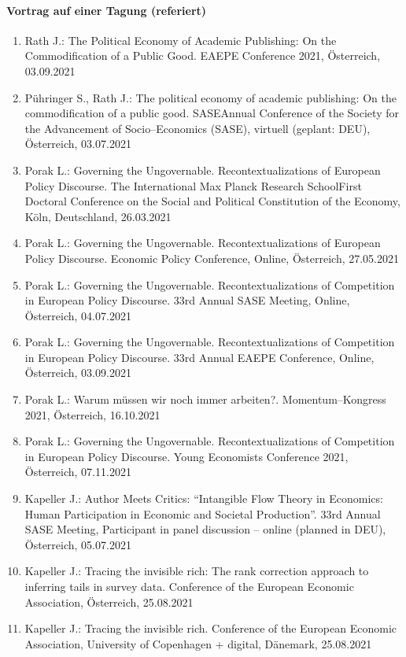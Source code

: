 \paragraph{Vortrag auf einer Tagung (referiert)}
\begin{enumerate}
	\item Rath J.: The Political Economy of Academic Publishing: On the Commodification of a Public Good. EAEPE Conference 2021, Österreich, 03.09.2021
	\item Pühringer S., Rath J.: The political economy of academic publishing: On the commodification of a public good. SASEAnnual Conference of the Society for the Advancement of Socio--Economics (SASE), virtuell (geplant: DEU), Österreich, 03.07.2021
	\item Porak L.: Governing the Ungovernable. Recontextualizations of European Policy Discourse. The International Max Planck Research SchoolFirst Doctoral Conference on the Social and Political Constitution of the Economy, Köln, Deutschland, 26.03.2021
	\item Porak L.: Governing the Ungovernable. Recontextualizations of European Policy Discourse. Economic Policy Conference, Online, Österreich, 27.05.2021
	\item Porak L.: Governing the Ungovernable. Recontextualizations of Competition in European Policy Discourse. 33rd Annual SASE Meeting, Online, Österreich, 04.07.2021
	\item Porak L.: Governing the Ungovernable. Recontextualizations of Competition in European Policy Discourse. 33rd Annual EAEPE Conference, Online, Österreich, 03.09.2021
	\item Porak L.: Warum müssen wir noch immer arbeiten?. Momentum--Kongress 2021, Österreich, 16.10.2021
	\item Porak L.: Governing the Ungovernable. Recontextualizations of Competition in European Policy Discourse. Young Economists Conference 2021, Österreich, 07.11.2021
	\item Kapeller J.: Author Meets Critics: “Intangible Flow Theory in Economics: Human Participation in Economic and Societal Production”. 33rd Annual SASE Meeting, Participant in panel discussion -- online (planned in DEU), Österreich, 05.07.2021
	\item Kapeller J.: Tracing the invisible rich: The rank correction approach to inferring tails in survey data. Conference of the European Economic Association, Österreich, 25.08.2021
	\item Kapeller J.: Tracing the invisible rich. Conference of the European Economic Association, University of Copenhagen + digital, Dänemark, 25.08.2021

\end{enumerate}
